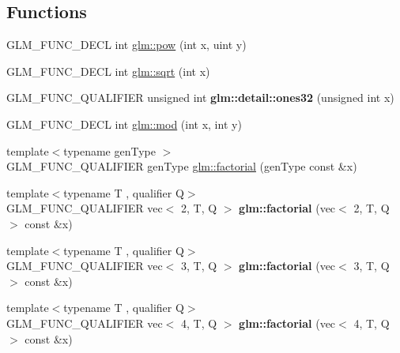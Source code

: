 \subsection*{Functions}
\begin{DoxyCompactItemize}
\item 
G\+L\+M\+\_\+\+F\+U\+N\+C\+\_\+\+D\+E\+CL int \hyperlink{group__gtx__integer_ga4937910d5d82dfd9c4bab3da7ff75399}{glm\+::pow} (int x, uint y)
\item 
G\+L\+M\+\_\+\+F\+U\+N\+C\+\_\+\+D\+E\+CL int \hyperlink{group__gtx__integer_ga78e2e68330e91d350fcfc2f4831cad12}{glm\+::sqrt} (int x)
\item 
\mbox{\label{gtx_2integer_8inl_a2699e3b3ea6ad8d4bb99aed56761582c}} 
G\+L\+M\+\_\+\+F\+U\+N\+C\+\_\+\+Q\+U\+A\+L\+I\+F\+I\+ER unsigned int {\bfseries glm\+::detail\+::ones32} (unsigned int x)
\item 
G\+L\+M\+\_\+\+F\+U\+N\+C\+\_\+\+D\+E\+CL int \hyperlink{group__gtx__integer_gab9d22df91aac4d9eb925a4910f556f1b}{glm\+::mod} (int x, int y)
\item 
{\footnotesize template$<$typename gen\+Type $>$ }\\G\+L\+M\+\_\+\+F\+U\+N\+C\+\_\+\+Q\+U\+A\+L\+I\+F\+I\+ER gen\+Type \hyperlink{group__gtx__integer_ga8cbd3120905f398ec321b5d1836e08fb}{glm\+::factorial} (gen\+Type const \&x)
\item 
\mbox{\label{gtx_2integer_8inl_af73a83e2217df256752550778ff86955}} 
{\footnotesize template$<$typename T , qualifier Q$>$ }\\G\+L\+M\+\_\+\+F\+U\+N\+C\+\_\+\+Q\+U\+A\+L\+I\+F\+I\+ER vec$<$ 2, T, Q $>$ {\bfseries glm\+::factorial} (vec$<$ 2, T, Q $>$ const \&x)
\item 
\mbox{\label{gtx_2integer_8inl_a786538577ea2e09359200d2500791041}} 
{\footnotesize template$<$typename T , qualifier Q$>$ }\\G\+L\+M\+\_\+\+F\+U\+N\+C\+\_\+\+Q\+U\+A\+L\+I\+F\+I\+ER vec$<$ 3, T, Q $>$ {\bfseries glm\+::factorial} (vec$<$ 3, T, Q $>$ const \&x)
\item 
\mbox{\label{gtx_2integer_8inl_a10d116af23a576c1e52a6d720b051ca3}} 
{\footnotesize template$<$typename T , qualifier Q$>$ }\\G\+L\+M\+\_\+\+F\+U\+N\+C\+\_\+\+Q\+U\+A\+L\+I\+F\+I\+ER vec$<$ 4, T, Q $>$ {\bfseries glm\+::factorial} (vec$<$ 4, T, Q $>$ const \&x)

\end{DoxyCompactItemize}
